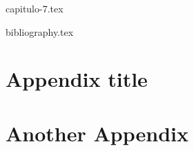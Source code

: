 \documentclass[11pt]{report}
\begin{document}
{capitulo-7.tex}


{bibliography.tex}



\appendix
\cleardoublepage


\chapter{Appendix title}

\chapter{Another Appendix}
\end{document}
